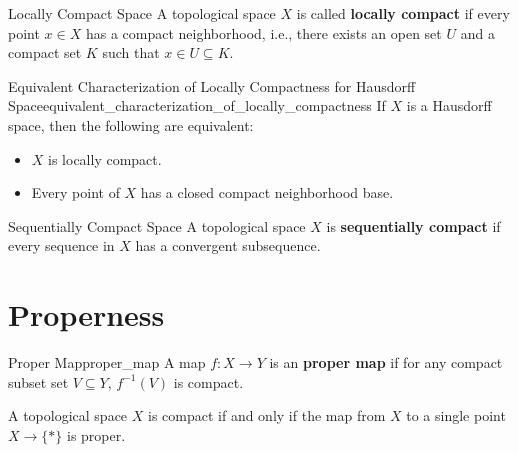 \documentclass{report}
\begin{document}
\begin{definition}{Locally Compact Space}{}
	A topological space $X$ is called \textbf{locally compact} if every point $x\in X$ has a compact neighborhood, i.e., there exists an open set $U$ and a compact set $K$ such that $x \in U \subseteq K$.
\end{definition}

\begin{proposition}{Equivalent Characterization of Locally Compactness for Hausdorff Space}{equivalent_characterization_of_locally_compactness}
	If $X$ is a Hausdorff space, then the following are equivalent:
	\begin{itemize}
		\item $X$ is locally compact.
		\item Every point of $X$ has a closed compact neighborhood base.
	\end{itemize}
\end{proposition}



\begin{definition}{Sequentially Compact Space}{}
	A topological space $X$ is \textbf{sequentially compact} if every sequence in $X$ has a convergent subsequence.
\end{definition}

\section{Properness}
\begin{definition}{Proper Map}{proper_map}
	A map $f:X\to Y$ is an \textbf{proper map} if for any compact subset set $V\subseteq Y$, $f^{-1}(V)$ is compact.
\end{definition}
\begin{proposition}{}{}
	A topological space $X$ is compact if and only if the map from $X$ to a single point $X\to\{*\}$ is proper.
\end{proposition}
\end{document}
